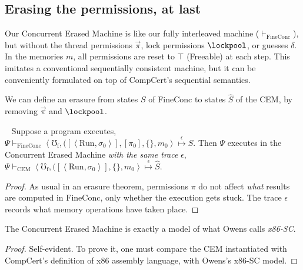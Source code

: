 \begin{comment}
We state these very reasonable conjectures here to motivate
our main theorem.
That is, \autoref{thm:mainresult} guarantees that
every sequentially-consistent-interleaved execution
of the machine-language program obeys the rules
of the Concurrent Permission Machine.  Intuitively that
guarantees race freedom.  More technically, we expect that
it guarantees \emph{release-acquire well-synchronized},
and therefore that any observable behavior on the weakly
consistent machine is equivalent to some behavior on a
(hypothetical) SC machine.  And therefore, by
\autoref{thm:mainresult}, all behaviors obey the
source-level specification in Concurrent Separation Logic.
\end{comment}

\subsection{Erasing the permissions, at last}
\label{sec:x86sc}
Our Concurrent Erased Machine is like our fully interleaved machine
($\vdash_\mathrm{FineConc}$), but without the thread permissions
$\vec{\pi}$, lock permissions $\lockpool$, or guesses $\delta$.  In
the memories $m$, all permissions are reset to $\top$ (Freeable) at
each step. This imitates a conventional sequentially consistent
machine, but it can be conveniently formulated on top of
CompCert's sequential semantics.

We can define an erasure from states $S$ of FineConc
to states $\hat{S}$ of the CEM, by removing
$\vec{\pi}$ and $\lockpool$.

\begin{theorem}
\label{thm:erasure-x86SC}
~ \newline
Suppose a program executes, 
$  
\Psi \vdash_\mathrm{FineConc}
\left<\mho_\mathrm{f},
([\left<\mathrm{Run},\sigma_0\right>],[\pi_0], \{\}, m_0\right>
\stackrel{\epsilon}\mapsto S$.
Then $\Psi$ executes
in the Concurrent Erased Machine \emph{with the same trace} $\epsilon$,\quad
$  
\Psi \vdash_\mathrm{CEM}
\left<\mho_\mathrm{f},
([\left<\mathrm{Run},\sigma_0\right>],\{\}, m_0\right>
\stackrel{\epsilon}\mapsto \hat{S}$.
\end{theorem}
\begin{proof}
  As usual in an erasure theorem,
  permissions $\pi$ do not affect
  \emph{what} results are computed in FineConc,
  only whether the execution gets stuck.
  The trace $\epsilon$ records what memory operations have taken place.
\end{proof}

\begin{claim}[x86-SC]
  The Concurrent Erased Machine is exactly a model of what Owens
  calls \emph{x86-SC}.
\end{claim}
\begin{proof}Self-evident.  To prove it, one must compare
  the CEM instantiated with CompCert's definition of x86 assembly
  language, with Owens's x86-SC model.
\end{proof}